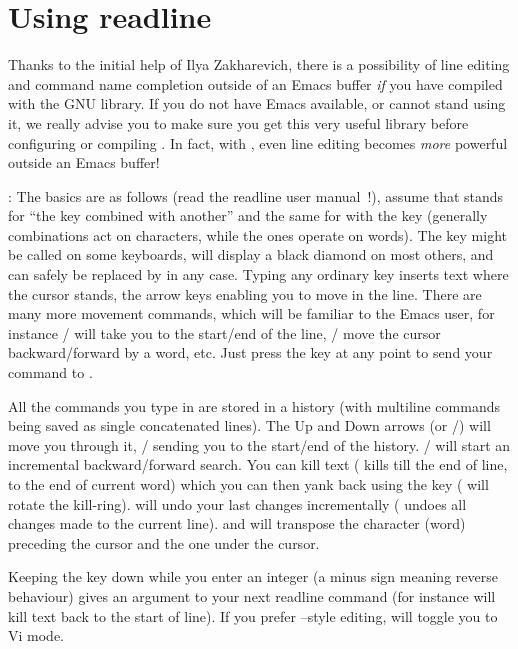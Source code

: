 \section{Using readline} 

  Thanks to the initial help of Ilya Zakharevich, there is a possibility of
line editing and command name completion outside of an Emacs buffer \emph{if}
you have compiled  with the GNU  library. If you do not
have Emacs available, or cannot stand using it, we really advise you to make
sure you get this very useful library before configuring or compiling
. In fact, with , even line editing becomes \emph{more}
powerful outside an Emacs buffer!

: \label{se:readline} The
basics are as follows (read the readline user manual~!), assume that 
stands for ``the  key combined with another'' and the same for
 with the  key (generally  combinations act on
characters, while the  ones operate on words). The  key
might be called  on some keyboards, will display a black diamond on
most others, and can safely be replaced by  in any case. Typing any
ordinary key inserts text where the cursor stands, the arrow keys enabling
you to move in the line. There are many more movement commands, which will be
familiar to the Emacs user, for instance / will take you to
the start/end of the line, / move the cursor
backward/forward by a word, etc. Just press the  key at any
point to send your command to .

  All the commands you type in are stored in a history (with multiline
commands being saved as single concatenated lines). The Up and Down arrows
(or /) will move you through it, /
sending you to the start/end of the history. / will start
an incremental backward/forward search. You can kill text ( kills
till the end of line,  to the end of current word) which you can
then yank back using the  key ( will rotate the kill-ring).
 will undo your last changes incrementally ( undoes all
changes made to the current line).  and  will transpose the
character (word) preceding the cursor and the one under the cursor.

  Keeping the  key down while you enter an integer (a minus sign
meaning reverse behaviour) gives an argument to your next readline command
(for instance  will kill text back to the start of line). If you
prefer --style editing,  will toggle you to Vi mode.

